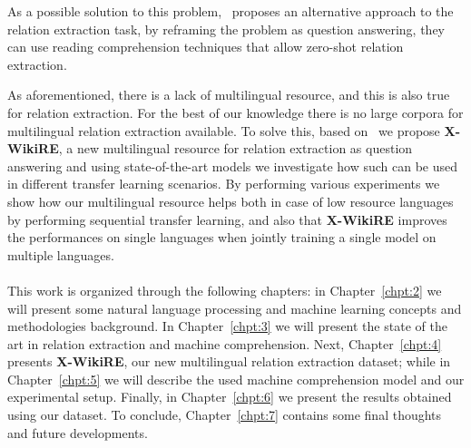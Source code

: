 As a possible solution to this problem,~\cite{levy2017zero} proposes an alternative approach to the relation extraction task, by reframing the problem as question answering, they can use reading comprehension techniques that allow zero-shot relation extraction. 

As aforementioned, there is a lack of multilingual resource, and this is also true for relation extraction. For the best of our knowledge there is no large corpora for multilingual relation extraction available. To solve this, based on~\citep{levy2017zero, hewlett2016wikireading} we propose \textbf{X-WikiRE}, a new multilingual resource for relation extraction as question answering and using state-of-the-art models we investigate how such can be used in different transfer learning scenarios. By performing various experiments we show how our multilingual resource helps both in case of low resource languages by performing sequential transfer learning, and also that \textbf{X-WikiRE} improves the performances on single languages when jointly training a single model on multiple languages.






\paragraph{}
This work is organized through the following chapters: in Chapter~\ref{chpt:2} we will present some natural language processing and machine learning concepts and methodologies background. In Chapter~\ref{chpt:3} we will present the state of the art in relation extraction and machine comprehension. Next, Chapter~\ref{chpt:4} presents \textbf{X-WikiRE}, our new multilingual relation extraction dataset; while in Chapter~\ref{chpt:5} we will describe the used machine comprehension model and our experimental setup. Finally, in Chapter~\ref{chpt:6} we present the results obtained using our dataset. To conclude, Chapter~\ref{chpt:7} contains some final thoughts and future developments.